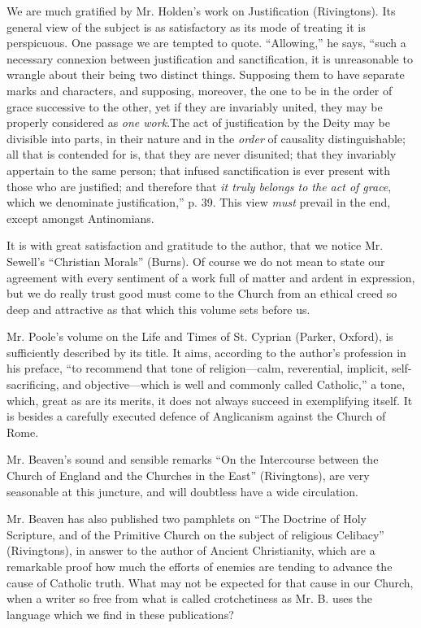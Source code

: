 We are much gratified by Mr. Holden's work on
Justification (Rivingtons). Its general view of the subject is as
satisfactory as its mode of treating it is perspicuous. One passage we
are tempted to quote. ``Allowing,'' he says, ``such a necessary connexion
between justification and sanctification, it is unreasonable to wrangle
about their being two distinct things. Supposing them to have separate
marks and characters, and supposing, moreover, the one to be in the
order of grace successive to the other, yet if they are invariably
united, they may be properly considered as \emph{one
work}.\emph{}The act of justification by the Deity may be divisible into parts,
in their nature and in the \emph{order}
of causality distinguishable; all that is contended for is, that
they are never disunited; that they invariably appertain to the same
person; that infused sanctification is ever present with those who are
justified; and therefore that \emph{it
truly belongs to the act of grace},
which we denominate justification,'' p. 39. This view \emph{must}
prevail in the end, except amongst Antinomians.

It is with great satisfaction and gratitude to the
author, that we notice Mr. Sewell's ``Christian Morals'' (Burns). Of
course we do not mean to state our agreement with every sentiment
of a work full of matter and ardent in expression, but we do really
trust good must come to the Church from an ethical creed so deep and
attractive as that which this volume sets before us.

Mr. Poole's volume on the Life and Times of St.
Cyprian (Parker, Oxford), is sufficiently described by its title. It
aims, according to the author's profession in his preface, ``to recommend
that tone of religion—calm, reverential, implicit, self-sacrificing,
and objective—which is well and commonly called Catholic,'' a tone,
which, great as are its merits, it does not always succeed in
exemplifying itself. It is besides a carefully executed defence of
Anglicanism against the Church of Rome.

Mr. Beaven's sound and sensible remarks ``On the
Intercourse between the Church of England and the Churches in the East''
(Rivingtons), are very seasonable at this juncture, and will doubtless
have a wide circulation.

Mr. Beaven has also published two pamphlets on ``The
Doctrine of Holy Scripture, and of the Primitive Church on the subject
of religious Celibacy'' (Rivingtons), in answer to the author of Ancient
Christianity, which are a remarkable proof how much the efforts of
enemies are tending to advance the cause of Catholic truth. What may not
be expected for that cause in our Church, when a writer so free from
what is called crotchetiness as Mr. B. uses the language which we find
in these publications?

